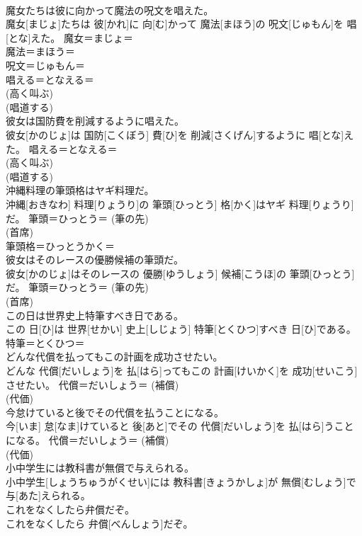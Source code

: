 \documentclass[8pt]{extreport}
\begin{document}
\begin{CJK}{UTF8}{min}
{\\	魔女たちは彼に向かって魔法の呪文を唱えた。	
\\	魔女[まじょ]たちは 彼[かれ]に 向[む]かって 魔法[まほう]の 呪文[じゅもん]を 唱[とな]えた。	魔女＝まじょ＝ 
\\	魔法＝まほう＝ 
\\	呪文＝じゅもん＝ 
\\	唱える＝となえる＝ 
\\	(高く叫ぶ) 
\\	(唱道する) 
\\	彼女は国防費を削減するように唱えた。	
\\	彼女[かのじょ]は 国防[こくぼう] 費[ひ]を 削減[さくげん]するように 唱[とな]えた。	唱える＝となえる＝ 
\\	(高く叫ぶ) 
\\	(唱道する) 
\\	沖縄料理の筆頭格はヤギ料理だ。	
\\	沖縄[おきなわ] 料理[りょうり]の 筆頭[ひっとう] 格[かく]はヤギ 料理[りょうり]だ。	筆頭＝ひっとう＝ (筆の先) 
\\	(首席) 
\\	筆頭格＝ひっとうかく＝ 
\\	彼女はそのレースの優勝候補の筆頭だ。	
\\	彼女[かのじょ]はそのレースの 優勝[ゆうしょう] 候補[こうほ]の 筆頭[ひっとう]だ。	筆頭＝ひっとう＝ (筆の先) 
\\	(首席) 
\\	この日は世界史上特筆すべき日である。	
\\	この 日[ひ]は 世界[せかい] 史上[しじょう] 特筆[とくひつ]すべき 日[ひ]である。	特筆＝とくひつ＝ 
\\	どんな代償を払ってもこの計画を成功させたい。	
\\	どんな 代償[だいしょう]を 払[はら]ってもこの 計画[けいかく]を 成功[せいこう]させたい。	代償＝だいしょう＝ (補償) 
\\	(代価) 
\\	今怠けていると後でその代償を払うことになる。	
\\	今[いま] 怠[なま]けていると 後[あと]でその 代償[だいしょう]を 払[はら]うことになる。	代償＝だいしょう＝ (補償) 
\\	(代価) 
\\	小中学生には教科書が無償で与えられる。	
\\	小中学生[しょうちゅうがくせい]には 教科書[きょうかしょ]が 無償[むしょう]で 与[あた]えられる。	
\\	これをなくしたら弁償だぞ。	
\\	これをなくしたら 弁償[べんしょう]だぞ。	
}
\end{CJK}
\end{document}

